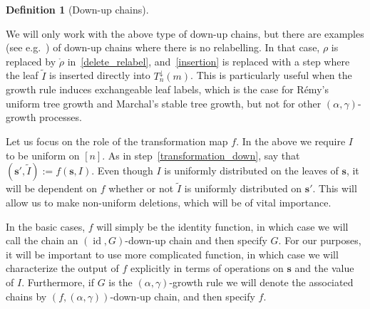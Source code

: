\documentclass[a4paper, final]{amsart}
\theoremstyle{plain}
\theoremstyle{definition}
\newtheorem{defi}[thm]{Definition}
\newcommand{\tree}[1][t]{\boldsymbol{#1}}
\DeclareMathOperator{\id}{id}
\begin{document}
\begin{defi}[Down-up chains]
\end{defi}
%
We will only work with the above type of down-up chains, but there are examples (see e.g.~\cite{RefWorks:doc:5b4cbc93e4b07f5746e47014}) of down-up chains where there is no relabelling.
In that case, $\rho$ is replaced by $\mathring{\rho}$ in~\ref{delete_relabel}, and~\ref{insertion} is replaced with a step where the leaf $\tilde{I}$ is inserted directly into $T_n^\downarrow(m)$.
This is particularly useful when the growth rule induces exchangeable leaf labels, which is the case for R\'{e}my's uniform tree growth and Marchal's stable tree growth, but not for other $(\alpha, \gamma)$-growth processes.

Let us focus on the role of the transformation map $f$.
In the above we require $I$ to be uniform on $[n]$.
As in step~\ref{transformation_down}, say that $\left( \tree[s]', \tilde{I} \right) := f \left( \tree[s], I \right)$.
Even though $I$ is uniformly distributed on the leaves of $\tree[s]$, it will be dependent on $f$ whether or not $\tilde{I}$ is uniformly distributed on $\tree[s]'$.
This will allow us to make non-uniform deletions, which will be of vital importance.

In the basic cases, $f$ will simply be the identity function, in which case we will call the chain an $(\id,G)$-down-up chain and then specify $G$.
For our purposes, it will be important to use more complicated function, in which case we will characterize the output of $f$ explicitly in terms of operations on $\tree[s]$ and the value of $I$.
Furthermore, if $G$ is the $(\alpha, \gamma)$-growth rule we will denote the associated chains by $\left(f, (\alpha, \gamma)\right)$-down-up chain, and then specify $f$.
\end{document}
